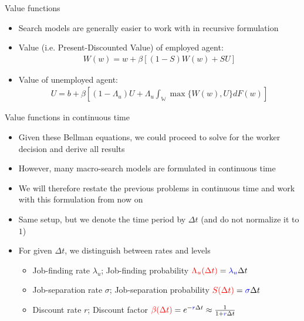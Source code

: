 \documentclass[9pt]{beamer}
\newcommand{\bit}{\begin{itemize}}
\newcommand{\eit}{\end{itemize}}
\newcommand{\bc}{\color{blue}}
\newcommand{\rc}{\color{red}}
\begin{document}
\begin{frame}{Value functions}

\bit
\setlength\itemsep{2em}

\item Search models are generally easier to work with in {\bc recursive formulation}

\item Value (i.e. Present-Discounted Value) of employed agent:
\begin{eqnarray}
W(w) =  w + \beta \left[(1-S)W(w) + S U \right] \nonumber
\end{eqnarray}

\item Value of unemployed agent:
\begin{eqnarray}
U = b + \beta \left[(1-\Lambda_{u}) U + \Lambda_{u} \int_{\mathds{W}} \max\{W(w), U\} dF(w) \right] \nonumber
\end{eqnarray}

\eit
\end{frame}





\begin{frame}{Value functions in continuous time}

\bit
\setlength\itemsep{1.5em}

\item Given these Bellman equations, we could proceed to solve for the worker decision and derive all results

\item However, many macro-search models are formulated in continuous time

\item We will therefore restate the previous problems in continuous time and work with this formulation from now on

\item Same setup, but we denote the time period by $\Delta t$ (and do not normalize it to $1$)

\item For given $\Delta t$, we distinguish between {\bc rates} and {\rc levels}
\bit
\setlength\itemsep{0.5em}
\item Job-finding rate $\lambda_u$; Job-finding probability ${\rc\Lambda_{u}(\Delta t)} = {\bc\lambda_u} \Delta t$

\item Job-separation rate $\sigma$; Job-separation probability ${\rc S(\Delta t)} = {\bc\sigma}  \Delta t$

\item Discount rate $r$; Discount factor ${\rc \beta (\Delta t)} = e^{-{\bc r} \Delta t} \approx \frac{1}{1+ {\bc r}\Delta t}$
\eit

%

\eit


\end{frame}
\end{document}
